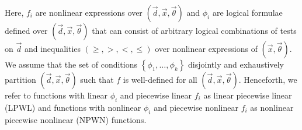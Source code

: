 \documentclass[letterpaper]{article}
\begin{document}
Here, {\footnotesize$ f_i $} are nonlinear expressions over {\footnotesize$( \vec{d}, \vec{x}, \vec{\theta})$} and {\footnotesize$\phi_i$} are logical formulae defined over {\footnotesize$( \vec{d}, \vec{x}, \vec{\theta})$} that can consist of arbitrary logical combinations of tests on {\footnotesize$\vec{d}$} and inequalities {\footnotesize$\left( \geq, >, <, \leq \right)$} over nonlinear expressions of   {\footnotesize$(\vec{x}, \vec{\theta})$}. We assume that the set of conditions {\footnotesize$\left\lbrace \phi_1, \ldots, \phi_k \right\rbrace$} disjointly and exhaustively partition {\footnotesize$(\vec{d}, \vec{x}, \vec{\theta})$} such that {\footnotesize$f$} is well-defined for all {\footnotesize$(\vec{d}, \vec{x}, \vec{\theta})$}. Henceforth, we refer to functions with linear {\footnotesize$\phi_i$} and piecewise linear {\footnotesize$f_i$} as linear piecewise linear (LPWL) and functions with nonlinear {\footnotesize$\phi_i$} and piecewise nonlinear {\footnotesize$f_i$} as nonlinear piecewise nonlinear (NPWN) functions.
\end{document}
